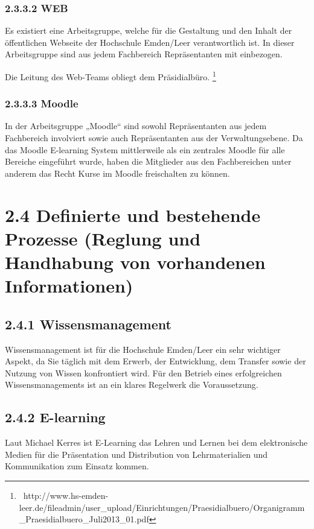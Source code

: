 \documentclass[a4paper]{article}
\newcommand\textstyleAbsatzStandardschriftart[1]{#1}
\begin{document}
\subsubsection[2.3.3.2 WEB]{2.3.3.2 WEB}
{\sffamily\mdseries\color{black}
Es existiert eine Arbeitsgruppe, welche für die Gestaltung und den Inhalt der öffentlichen Webseite der Hochschule
Emden/Leer verantwortlich ist. In dieser Arbeitsgruppe sind aus jedem Fachbereich Repräsentanten mit einbezogen.}

{\sffamily\mdseries\color{black}
Die Leitung des Web-Teams obliegt dem Präsidialbüro.
\footnote{\ http://www.hs-emden-leer.de/fileadmin/user\_upload/Einrichtungen/Praesidialbuero/Organigramm\_Praesidialbuero\_Juli2013\_01.pdf}}

\subsubsection{2.3.3.3 Moodle}
{\sffamily\mdseries\color{black}
In der Arbeitsgruppe „Moodle“ sind sowohl Repräsentanten aus jedem Fachbereich involviert sowie auch Repräsentanten aus
der Verwaltungsebene. Da das Moodle E-learning System mittlerweile als ein zentrales Moodle für alle Bereiche
eingeführt wurde, haben die Mitglieder aus den Fachbereichen unter anderem das Recht Kurse im Moodle freischalten zu
können. }


\bigskip

\section{2.4 Definierte und bestehende Prozesse (Reglung und Handhabung von vorhandenen Informationen)}
\subsection[2.4.1 Wissensmanagement]{\bfseries 2.4.1 Wissensmanagement}
{\sffamily\mdseries\color{black}
\textstyleAbsatzStandardschriftart{Wissensmanagement ist für die Hochschule Emden/Leer ein sehr wichtiger Aspekt, da Sie
täglich mit dem Erwerb, der Entwicklung, dem Transfer sowie der Nutzung von Wissen konfrontiert wird. Für den Betrieb
eines erfolgreichen Wissensmanagements ist an ein klares Regelwerk die Voraussetzung. \ }}

\subsection[2.4.2 E{}-learning]{\bfseries 2.4.2 E-learning}
{\sffamily\color{black}
Laut Michael Kerres ist E-Learning das Lehren und Lernen bei dem elektronische Medien für die Präsentation und
Distribution von Lehrmaterialien und Kommunikation zum Einsatz kommen. }
\end{document}
